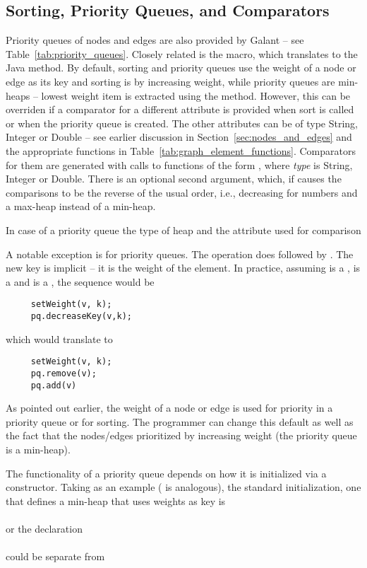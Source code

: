 \subsection{Sorting, Priority Queues, and Comparators}

Priority queues of nodes and edges are also provided by Galant -- see
Table~\ref{tab:priority_queues}.
Closely related is the  macro, which translates to the Java
 method.
By default, sorting and priority queues use the weight of a node or edge as
its key and sorting is by increasing weight, while priority queues are
min-heaps -- lowest weight item is extracted using the  method.
However, this can be overriden if a comparator for a different attribute is
provided when sort is called or when the priority queue is created.
The other attributes can be of type String, Integer or Double -- see earlier
discussion in Section~\ref{sec:nodes_and_edges}
and the appropriate functions in Table~\ref{tab:graph_element_functions}.
Comparators for them are generated with calls to functions of the form
, where \emph{type} is String, Integer or
Double.
There is an optional second argument, which, if  causes the
comparisons to be the reverse of the usual order, i.e., decreasing for
numbers and a max-heap instead of a min-heap.

In case of a priority queue the type of heap and the attribute used for comparison

A notable exception is 
for priority queues.
The operation 
does  followed by .
The new key is implicit -- it is the weight of the element.
In practice, assuming  is a ,
 is a 
and  is a , the sequence would be
\begin{verbatim}
     setWeight(v, k);
     pq.decreaseKey(v,k);
\end{verbatim}
which would translate to
\begin{verbatim}
     setWeight(v, k);
     pq.remove(v);
     pq.add(v)
\end{verbatim}
As pointed out earlier,
the weight of a node or edge is used for priority in a priority
queue or for sorting.
The programmer can change this default
as well as the fact that the nodes/edges prioritized by increasing weight
(the priority queue is a min-heap).

The functionality of a priority queue depends on how it is initialized via a
constructor. Taking  as an example
( is analogous), the standard initialization, one
that defines a min-heap that uses weights as key is\\
\\
or the
declaration\\
\\
could be separate from\\
\\

